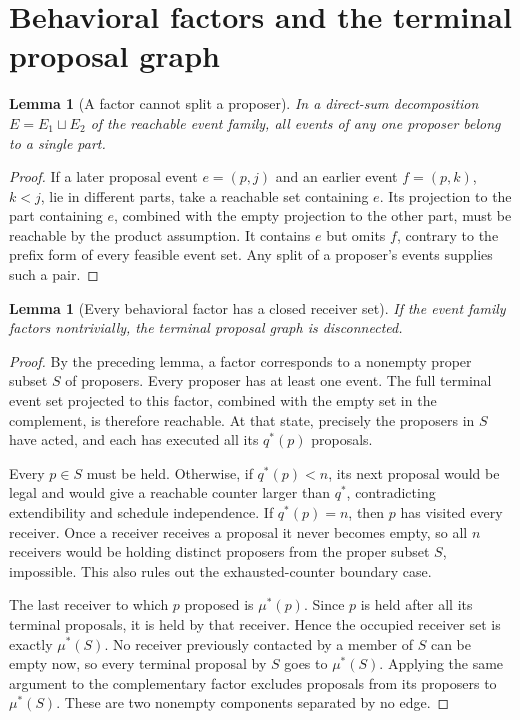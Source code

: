 \documentclass[11pt,a4paper]{article}
\newtheorem{lemma}[theorem]{Lemma}
\begin{document}
\section{Behavioral factors and the terminal proposal graph}
\begin{lemma}[A factor cannot split a proposer]
In a direct-sum decomposition $E=E_1\sqcup E_2$ of the reachable event family, all events of any one proposer belong to a single part.
\end{lemma}
\begin{proof}
If a later proposal event $e=(p,j)$ and an earlier event $f=(p,k)$, $k<j$, lie in different parts, take a reachable set containing $e$. Its projection to the part containing $e$, combined with the empty projection to the other part, must be reachable by the product assumption. It contains $e$ but omits $f$, contrary to the prefix form of every feasible event set. Any split of a proposer's events supplies such a pair.
\end{proof}

\begin{lemma}[Every behavioral factor has a closed receiver set]
If the event family factors nontrivially, the terminal proposal graph is disconnected.
\end{lemma}
\begin{proof}
By the preceding lemma, a factor corresponds to a nonempty proper subset $S$ of proposers. Every proposer has at least one event. The full terminal event set projected to this factor, combined with the empty set in the complement, is therefore reachable. At that state, precisely the proposers in $S$ have acted, and each has executed all its $q^*(p)$ proposals.

Every $p\in S$ must be held. Otherwise, if $q^*(p)<n$, its next proposal would be legal and would give a reachable counter larger than $q^*$, contradicting extendibility and schedule independence. If $q^*(p)=n$, then $p$ has visited every receiver. Once a receiver receives a proposal it never becomes empty, so all $n$ receivers would be holding distinct proposers from the proper subset $S$, impossible. This also rules out the exhausted-counter boundary case.

The last receiver to which $p$ proposed is $\mu^*(p)$. Since $p$ is held after all its terminal proposals, it is held by that receiver. Hence the occupied receiver set is exactly $\mu^*(S)$. No receiver previously contacted by a member of $S$ can be empty now, so every terminal proposal by $S$ goes to $\mu^*(S)$. Applying the same argument to the complementary factor excludes proposals from its proposers to $\mu^*(S)$. These are two nonempty components separated by no edge.
\end{proof}
\end{document}
